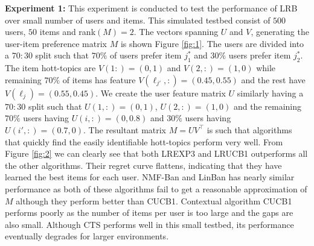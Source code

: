 \textbf{Experiment 1:} This experiment is conducted to test the performance of LRB over  small number of users and items. This simulated testbed consist of $500$ users, $50$ items and rank$(M) = 2$. The vectors spanning $U$ and $V$, generating the user-item preference matrix $M$ is shown Figure \ref{fig:1}. The users are divided into a $70:30$ split such that $70\%$ of users prefer item $j^*_1$ and $30\%$ users prefer item  $j^*_2$. The item hott-topics are $V(1:) = (0,1)$ and $V(2,:) = (1, 0)$ while remaining $70\%$ of items has feature $V(\ell_{j'},:) = (0.45, 0.55)$ and the rest have $V(\ell_{j}) = (0.55, 0.45)$. We create the user feature matrix $U$ similarly having a $70:30$ split such that $U(1,:) = (0,1)$, $U(2,:) = (1,0)$ and the remaining $70\%$ users having $U(i,:) = (0,0.8)$ and $30\%$ users having $U(i',:) = (0.7,0)$. The resultant matrix $M =UV^{\intercal}$ is such that algorithms that quickly find the easily identifiable hott-topics perform very well. From Figure \ref{fig:2} we can clearly see that both LREXP3 and LRUCB1 outperforms all the other algorithms. Their regret curve flattens, indicating that they have learned the best items for each user.  NMF-Ban and LinBan has nearly similar performance as both of these algorithms fail to get a reasonable approximation of $M$ although they perform better than CUCB1. Contextual algorithm CUCB1 performs poorly as the number of items per user is too large and the gaps are also small. Although CTS performs well in this small testbed, its performance eventually degrades for larger environments. 


